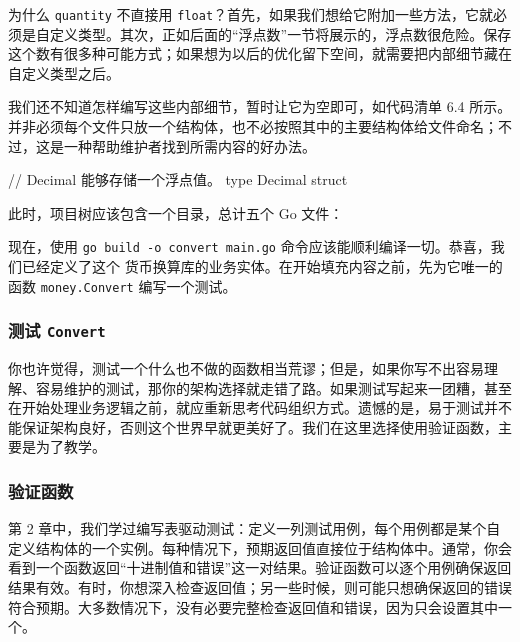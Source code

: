 为什么 \texttt{quantity} 不直接用 \texttt{float}？首先，如果我们想给它附加一些方法，它就必须是自定义类型。其次，正如后面的“浮点数”一节将展示的，浮点数很危险。保存这个数有很多种可能方式；如果想为以后的优化留下空间，就需要把内部细节藏在自定义类型之后。

我们还不知道怎样编写这些内部细节，暂时让它为空即可，如代码清单 6.4 所示。并非必须每个文件只放一个结构体，也不必按照其中的主要结构体给文件命名；不过，这是一种帮助维护者找到所需内容的好办法。

\begin{gocode}[title={代码清单 6.4 decimal.go：\texttt{Decimal} 结构体}]
// Decimal 能够存储一个浮点值。
type Decimal struct {
}
\end{gocode}

此时，项目树应该包含一个目录，总计五个 Go 文件：

\begin{treebox}
\end{treebox}

现在，使用 \texttt{go build -o convert main.go} 命令应该能顺利编译一切。恭喜，我们已经定义了这个
货币换算库的业务实体。在开始填充内容之前，先为它唯一的函数 \texttt{money.Convert} 编写一个测试。

\subsubsection*{测试 \texttt{Convert}}

你也许觉得，测试一个什么也不做的函数相当荒谬；但是，如果你写不出容易理解、容易维护的测试，那你的架构选择就走错了路。如果测试写起来一团糟，甚至在开始处理业务逻辑之前，就应重新思考代码组织方式。遗憾的是，易于测试并不能保证架构良好，否则这个世界早就更美好了。我们在这里选择使用验证函数，主要是为了教学。

\subsubsection*{验证函数}

第 2 章中，我们学过编写表驱动测试：定义一列测试用例，每个用例都是某个自定义结构体的一个实例。每种情况下，预期返回值直接位于结构体中。通常，你会看到一个函数返回“十进制值和错误”这一对结果。验证函数可以逐个用例确保返回结果有效。有时，你想深入检查返回值；另一些时候，则可能只想确保返回的错误符合预期。大多数情况下，没有必要完整检查返回值和错误，因为只会设置其中一个。

